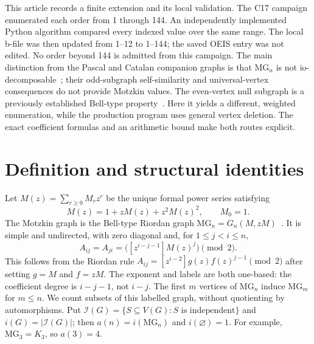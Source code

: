 \documentclass[11pt,a4paper]{article}
\newcommand{\MG}{\mathrm{MG}}
\newcommand{\IS}{\mathcal{I}}
\begin{document}
This article records a finite extension and its local validation.
The C17 campaign enumerated each order from 1 through 144.  An independently
implemented Python algorithm compared every indexed value over the same
range.  The local b-file was then updated from 1--12 to 1--144; the saved OEIS
entry was not edited.  No order beyond 144 is admitted from this campaign.
The main distinction from the Pascal and Catalan companion graphs is that
$\MG_n$ is not io-decomposable~\cite{structure}; their odd-subgraph
self-similarity and universal-vertex consequences do not provide Motzkin
values.  The even-vertex null subgraph is a previously established Bell-type
property~\cite{structure}.  Here it yields a different,
weighted enumeration, while the production program uses general vertex
deletion.  The exact coefficient formulas and an arithmetic bound make both
routes explicit.

\section{Definition and structural identities}\label{sec:def}
Let $M(z)=\sum_{r\geq0}M_rz^r$ be the unique formal power series satisfying
\begin{equation}\label{eq:motzkin}
 M(z)=1+zM(z)+z^2M(z)^2,\qquad M_0=1.
\end{equation}
The Motzkin graph is the Bell-type Riordan graph
$\MG_n=G_n(M,zM)$~\cite{structure,counting}.  It is simple and undirected,
with zero diagonal and, for $1\leq j<i\leq n$,
\begin{equation}\label{eq:edge}
 A_{ij}=A_{ji}=\bigl([z^{i-j-1}]M(z)^j\bigr)\pmod{2}.
\end{equation}
This follows from the Riordan rule
$A_{ij}=[z^{i-2}]g(z)f(z)^{j-1}\pmod{2}$ after setting
$g=M$ and $f=zM$.  The exponent and labels are both one-based: the
coefficient degree is $i-j-1$, not $i-j$.  The first $m$ vertices of
$\MG_n$ induce $\MG_m$ for $m\leq n$.  We count subsets of this labelled
graph, without quotienting by automorphisms.  Put
$\IS(G)=\{S\subseteq V(G):S\text{ is independent}\}$ and $i(G)=|\IS(G)|$;
then $a(n)=i(\MG_n)$ and $i(\varnothing)=1$.  For example,
$\MG_3=K_3$, so $a(3)=4$.
\end{document}
